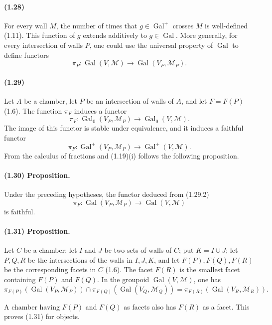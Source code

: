 \documentclass[10pt]{article}
\begin{document}
\paragraph{(1.28)} For every wall \(M\), the number of times that \(g\in\operatorname{Gal}^+\) crosses \(M\) is well-defined (1.11). This function of \(g\) extends additively to \(g\in\operatorname{Gal}\). More generally, for every intersection of walls \(P\), one could use the universal property of \(\operatorname{Gal}\) to define functors
\[
\pi_P:\operatorname{Gal}(V,\mathcal M)\longrightarrow\operatorname{Gal}(V_P,\mathcal M_P).
\]

\paragraph{(1.29)} Let \(A\) be a chamber, let \(P\) be an intersection of walls of \(A\), and let \(F=F(P)\) (1.6). The function \(\pi_F\) induces a functor
\[
\tag{1.29.1}
\pi_F:\operatorname{Gal}_0(V_P,\mathcal M_P)\longrightarrow\operatorname{Gal}_0(V,\mathcal M).
\]
The image of this functor is stable under equivalence, and it induces a faithful functor
\[
\tag{1.29.2}
\pi_F:\operatorname{Gal}^+(V_P,\mathcal M_P)\longrightarrow\operatorname{Gal}^+(V,\mathcal M).
\]
From the calculus of fractions and (1.19)(i) follows the following proposition.

\paragraph{(1.30) Proposition.} Under the preceding hypotheses, the functor deduced from (1.29.2)
\[
\pi_F:\operatorname{Gal}(V_P,\mathcal M_P)\longrightarrow\operatorname{Gal}(V,\mathcal M)
\]
is faithful.

\paragraph{(1.31) Proposition.} Let \(C\) be a chamber; let \(I\) and \(J\) be two sets of walls of \(C\); put \(K=I\cup J\); let \(P,Q,R\) be the intersections of the walls in \(I,J,K\), and let \(F(P),F(Q),F(R)\) be the corresponding facets in \(C\) (1.6). The facet \(F(R)\) is the smallest facet containing \(F(P)\) and \(F(Q)\). In the groupoid \(\operatorname{Gal}(V,\mathcal M)\), one has
\[
\pi_{F(P)}(\operatorname{Gal}(V_P,\mathcal M_P))\cap
\pi_{F(Q)}(\operatorname{Gal}(V_Q,\mathcal M_Q))
=
\pi_{F(R)}(\operatorname{Gal}(V_R,\mathcal M_R)).
\]

A chamber having \(F(P)\) and \(F(Q)\) as facets also has \(F(R)\) as a facet. This proves (1.31) for objects.
\end{document}
